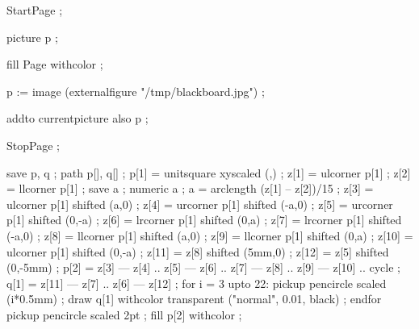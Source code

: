 

StartPage ;

picture p ;

fill Page withcolor  ;

p := image (externalfigure "/tmp/blackboard.jpg") ;

addto currentpicture also p ;

StopPage ;
\stopuseMPgraphic 





\setupTitle
  [color=simpleslides:contrastcolor]


\setupSlideTitle
  [\c!color={simpleslides:contrastcolor},
   \c!alternative=layer,
   \c!align=\v!center,
   \c!width=\textwidth,
   \c!height=3cm,
   \c!after=]


save p, q ; path p[], q[] ;
p[1] = unitsquare xyscaled (\overlaywidth,\overlayheight) ;
z[1] = ulcorner p[1] ;
z[2] = llcorner p[1] ;
save a ; numeric a ;
a = arclength (z[1] -- z[2])/15 ;
z[3] = ulcorner p[1] shifted (a,0) ;
z[4] = urcorner p[1] shifted (-a,0) ;
z[5] = urcorner p[1] shifted (0,-a) ;
z[6] = lrcorner p[1] shifted (0,a) ;
z[7] = lrcorner p[1] shifted (-a,0) ;
z[8] = llcorner p[1] shifted (a,0) ;
z[9] = llcorner p[1] shifted (0,a) ;
z[10] = ulcorner p[1] shifted (0,-a) ;
z[11] = z[8] shifted (5mm,0) ;
z[12] = z[5] shifted (0,-5mm) ;
p[2] = z[3] --- z[4] .. z[5] --- z[6]  .. z[7] --- z[8] .. z[9] --- z[10] .. cycle ;
q[1] = z[11] --- z[7] .. z[6] --- z[12] ;
for i = 3 upto 22:
	pickup pencircle scaled (i*0.5mm) ;
	draw q[1] withcolor transparent ("normal", 0.01, black) ;
endfor
pickup pencircle scaled 2pt ;
fill p[2] withcolor  ;
\stopuniqueMPgraphic


\Important%
  {\blank[line]}


\setupitemize[1][color={simpleslides:itemize:color}]

\protect
\stopmodule

\endinput

